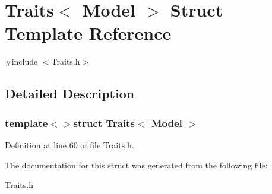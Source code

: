 \hypertarget{struct_traits_3_01_model_01_4}{\section{Traits$<$ Model $>$ Struct Template Reference}
\label{struct_traits_3_01_model_01_4}
}


{\ttfamily \#include $<$Traits.\-h$>$}



\subsection{Detailed Description}
\subsubsection*{template$<$$>$struct Traits$<$ Model $>$}



Definition at line 60 of file Traits.\-h.



The documentation for this struct was generated from the following file\-:\begin{DoxyCompactItemize}
\item 
\hyperlink{_traits_8h}{Traits.\-h}\end{DoxyCompactItemize}
